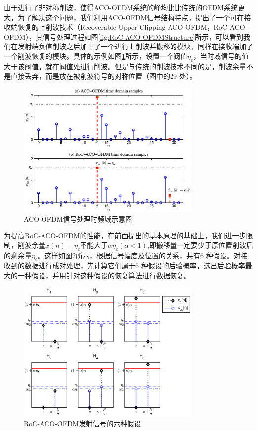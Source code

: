 由于进行了非对称削波，使得ACO-OFDM系统的峰均比比传统的OFDM系统更大，为了解决这个问题，我们利用ACO-OFDM信号结构特点，提出了一个可在接收端恢复的上削波技术（Recoverable Upper Clipping ACO-OFDM，RoC-ACO-OFDM）\cite{xu2014aco}，其信号处理过程如图\ref{fig:RoC-ACO-OFDMStructure}所示，可以看到我们在发射端负值削波之后加上了一个进行上削波并搬移的模块，同样在接收端加了一个削波恢复的模块。具体的示例如图\ref{fig:SCH_data}所示，设置一个阀值$\eta_c$，当时域信号的值大于该阀值，就在阀值处进行削波。但是与传统的削波技术不同的是，削波余量不是直接丢弃，而是放在被削波符号的对称位置（图中的29 处）。
\begin{figure}[htbp]
    \centering
    \includegraphics[width=0.8\textwidth]{figures/chapter-2/SCH_data.eps}
    \caption{ACO-OFDM信号处理时频域示意图}
    \label{fig:SCH_data}
\end{figure}
为提高RoC-ACO-OFDM的性能，在前面提出的基本原理的基础上，我们进一步限制，削波余量$x(n)-\eta_c$不能大于$\alpha \eta_c(\alpha<1)$,即搬移量一定要少于原位置削波后的剩余量$\eta_c$。这样如图\ref{fig:HypothesisSketch}所示，根据信号幅度及位置的关系，共有6 种假设。对接收到的数据进行成对处理，先计算它们属于6 种假设的后验概率，选出后验概率最大的一种假设，并用针对这种假设的恢复算法进行数据恢复。
\begin{figure}[htbp]
    \centering
    \includegraphics[width=0.8\textwidth]{figures/chapter-2/HypothesisSketch.eps}
    \caption{RoC-ACO-OFDM发射信号的六种假设}
    \label{fig:HypothesisSketch}
\end{figure}

